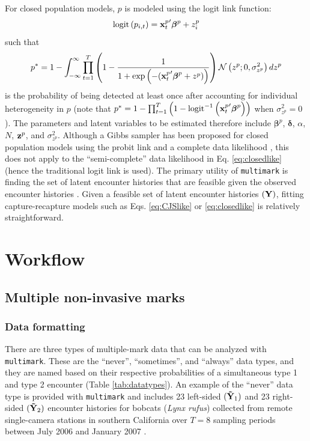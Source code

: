\documentclass[12pt]{article}
\begin{document}
For closed population models, $p$ is modeled using the logit link function:
\begin{equation*}
  \text{logit} \left( p_{i,t} \right) = {{\bf x}^p_t}^\prime \boldsymbol{\beta}^p + z^p_i
\end{equation*}
such that
\begin{equation*}
  p^* = 1 - \int_{-\infty}^{\infty} \prod_{t=1}^T \left(1-\frac{1}{1+\exp\left(-({{\bf x}^p_t}^\prime \boldsymbol{\beta}^p + z^p)\right)} \right) {\cal N}\left(z^p;0,\sigma^2_{z^p}\right) dz^p
\end{equation*}
is the probability of being detected at least once after accounting for individual heterogeneity in $p$ (note that $p^* = 1 - \prod_{t=1}^T \left(1- \text{logit}^{-1} \left({{\bf x}^p_t}^\prime \boldsymbol{\beta}^p\right) \right)$ when $\sigma^2_{z^p}=0$). The parameters and latent variables to be estimated therefore include $\boldsymbol{\beta}^p$, ${\boldsymbol \delta}$, $\alpha$, $N$, ${\bf z}^p$, and $\sigma^2_{z^p}$. Although a Gibbs sampler has been proposed for closed population models using the probit link and a complete data likelihood \citep{McClintockEtAl2014}, this does not apply to the ``semi-complete'' data likelihood in Eq. \ref{eq:closedlike} (hence the traditional logit link is used). The primary utility of \verb|multimark| is finding the set of latent encounter histories that are feasible given the observed encounter histories \citep[sensu][]{LinkEtAl2010,BonnerHolmberg2013,McClintockEtAl2013a,McClintockEtAl2014}. Given a feasible set of latent encounter histories $({\bf Y})$, fitting capture-recapture models such as Eqs. \ref{eq:CJSlike} or \ref{eq:closedlike} is relatively straightforward.

\section{Workflow}
\subsection{Multiple non-invasive marks}
\subsubsection{Data formatting}
There are three types of multiple-mark data that can be analyzed with \verb|multimark|. These are the ``never'', ``sometimes'', and ``always'' data types, and they are named based on their respective probabilities of a simultaneous type 1 and type 2 encounter (Table \ref{tab:datatypes}). An example of the ``never'' data type is provided with \verb|multimark| and includes 23 left-sided $({\bf {\tilde Y}}_1)$ and 23 right-sided $({\bf {\tilde Y}}_2)$ encounter histories for bobcats ({\it Lynx rufus}) collected from remote single-camera stations in southern California over $T=8$ sampling periods between July 2006 and January 2007 \citep{McClintockEtAl2013a,AlonsoEtAl2015}. 
\end{document}
